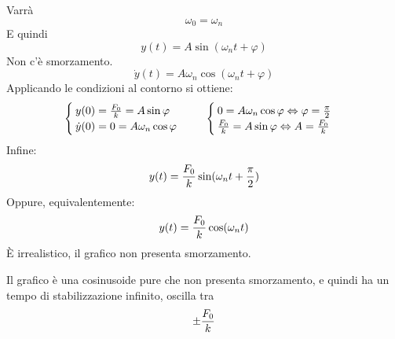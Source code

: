 \documentclass[a4paper, 15pt]{article}
\begin{document}
\begin{adjustwidth}{2in}{}
\begin{enumerate}[label=(\Roman*)]
	Varrà
	\[ \omega_0 = \omega_n\] 
	E quindi 
	\[y(t) = A\sin(\omega_nt + \varphi)\]
	Non c'è smorzamento. 
	\[ \dot{y}(t) = A\omega_n\cos(\omega_nt + \varphi)\]
	Applicando le condizioni al contorno si ottiene: 
	\[\begin{cases}
		y(0) = {F_0\over k} = A\sin\varphi \\
		\dot{y}(0) = 0 = A\omega_n\cos\varphi
	\end{cases} \hspace{0.5cm} \begin{cases}
		0 = A\omega_n\cos\varphi \Leftrightarrow \varphi = {\pi\over2} \\
		{F_0\over k} = A\sin\varphi \Leftrightarrow A =  {F_0\over k}
	\end{cases} \]
	Infine:
	\[y(t) = {F_0\over k}\sin(\omega_nt + {\pi\over2})\]
	Oppure, equivalentemente:
	\[y(t) = {F_0\over k}\cos(\omega_nt)\]
	È irrealistico, il grafico non presenta smorzamento.
	
	Il grafico è una cosinusoide pure che non presenta smorzamento, e quindi ha un tempo di stabilizzazione infinito, oscilla tra \[\pm{F_0\over k}\]
\end{enumerate}
\end{adjustwidth}
\end{document}
